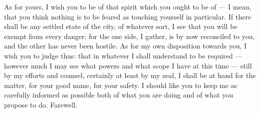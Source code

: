  As for yours, I wish you to be of that spirit which you ought to be of --- I mean, that you think nothing is to be feared as touching yourself in particular. If there shall be any settled state of the city, of whatever sort, I see that you will be exempt from every danger; for the one side, I gather, is by now reconciled to you, and the other has never been hostile. As for my own disposition towards you, I wish you to judge thus: that in whatever I shall understand to be required --- however much I may see what powers and what scope I have at this time --- still by my efforts and counsel, certainly at least by my zeal, I shall be at hand for the matter, for your good name, for your safety. I should like you to keep me as carefully informed as possible both of what you are doing and of what you propose to do. Farewell.
